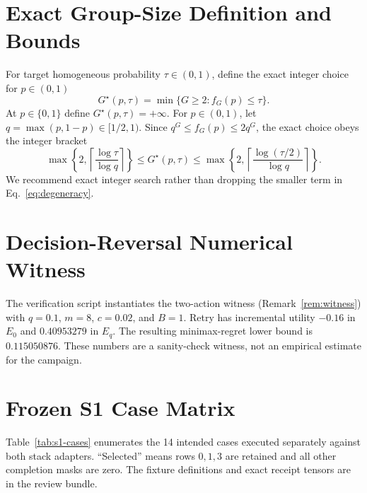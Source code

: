 \documentclass{article}
\begin{document}



\appendix

\section{Exact Group-Size Definition and Bounds}

For target homogeneous probability $\tau\in(0,1)$, define the exact integer
choice for $p\in(0,1)$
\begin{equation}
 G^\star(p,\tau)=\min\{G\geq2:f_G(p)\leq\tau\}.
\end{equation}
At $p\in\{0,1\}$ define $G^\star(p,\tau)=+\infty$.  For $p\in(0,1)$, let
$q=\max(p,1-p)\in[1/2,1)$.  Since
$q^G\leq f_G(p)\leq2q^G$, the exact choice obeys the integer bracket
\begin{equation}
 \max\!\left\{2,\left\lceil\frac{\log\tau}{\log q}\right\rceil\right\}
 \leq G^\star(p,\tau) \leq
 \max\!\left\{2,\left\lceil\frac{\log(\tau/2)}{\log q}\right\rceil\right\}.
\end{equation}
We recommend exact integer search rather than dropping the smaller term in
Eq.~\eqref{eq:degeneracy}.

\section{Decision-Reversal Numerical Witness}

The verification script instantiates the two-action witness
(Remark~\ref{rem:witness}) with $q=0.1$, $m=8$,
$c=0.02$, and $B=1$.  Retry has incremental utility $-0.16$ in $E_0$ and
$0.40953279$ in $E_q$.  The resulting minimax-regret lower bound is
$0.115050876$.  These numbers are a sanity-check witness, not an empirical
estimate for the campaign.

\section{Frozen S1 Case Matrix}
\label{app:cases}

Table~\ref{tab:s1-cases} enumerates the 14 intended cases executed separately
against both stack adapters.  ``Selected'' means rows $0,1,3$ are retained and
all other completion masks are zero.  The fixture definitions and exact receipt tensors
are in the review bundle.
\end{document}
